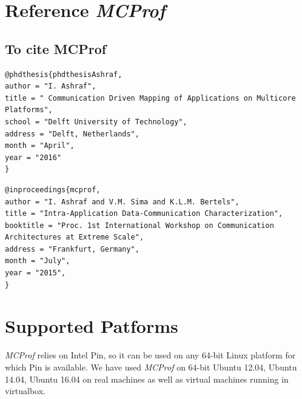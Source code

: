 \documentclass[10pt]{article}
\newcommand{\MCPROF}{\emph{MCProf}}
\begin{document}
\section{Reference \MCPROF{}}

\subsection{To cite MCProf}

{
\tiny
\begin{Verbatim}[frame=single, samepage=true]
@phdthesis{phdthesisAshraf,
author = "I. Ashraf",
title = " Communication Driven Mapping of Applications on Multicore Platforms",
school = "Delft University of Technology",
address = "Delft, Netherlands",
month = "April",
year = "2016"
}
\end{Verbatim}
}

{
\tiny
\begin{Verbatim}[frame=single, samepage=true]
@inproceedings{mcprof,
author = "I. Ashraf and V.M. Sima and K.L.M. Bertels",
title = "Intra-Application Data-Communication Characterization",
booktitle = "Proc. 1st International Workshop on Communication Architectures at Extreme Scale",
address = "Frankfurt, Germany",
month = "July",
year = "2015",
}
\end{Verbatim}
}

% 


\section{Supported Patforms}
\label{sec:platform}

\MCPROF{} relies on Intel Pin, so it can be used on any 64-bit Linux platform for 
which Pin is available. We have used \MCPROF{} on 64-bit Ubuntu 12.04, Ubuntu 
14.04, Ubuntu 16.04 on real machines as well as virtual machines running in virtualbox.
\end{document}
